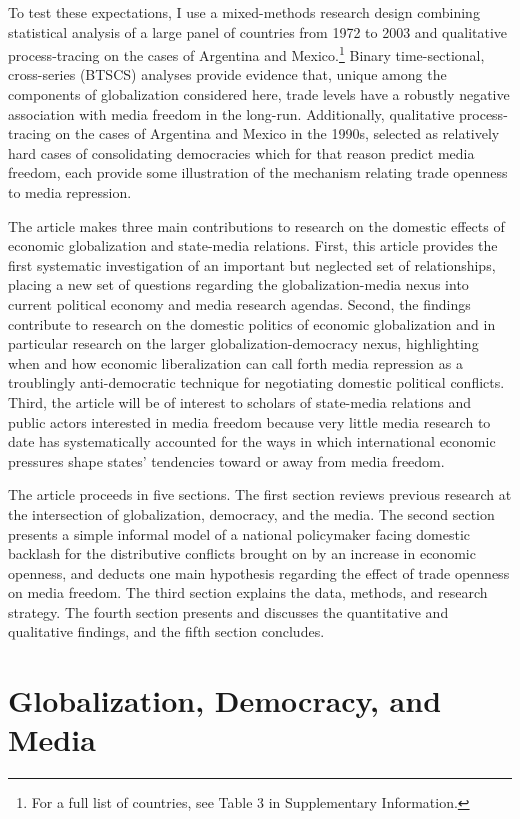 \documentclass[12pt,a4paper]{article}\usepackage[]{graphicx}\usepackage[]{color}
\begin{document}
To test these expectations, I use a mixed-methods research design combining statistical analysis of a large panel of countries from 1972 to 2003 and qualitative process-tracing on the cases of Argentina and Mexico.\footnote{For a full list of countries, see Table 3 in Supplementary Information.} Binary time-sectional, cross-series (BTSCS) analyses provide evidence that, unique among the components of globalization considered here, trade levels have a robustly negative association with media freedom in the long-run. Additionally, qualitative process-tracing on the cases of Argentina and Mexico in the 1990s, selected as relatively hard cases of consolidating democracies which for that reason predict media freedom, each provide some illustration of the mechanism relating trade openness to media repression.

The article makes three main contributions to research on the domestic effects of economic globalization and state-media relations. First, this article provides the first systematic investigation of an important but neglected set of relationships, placing a new set of questions regarding the globalization-media nexus into current political economy and media research agendas. Second, the findings contribute to research on the domestic politics of economic globalization and in particular research on the larger globalization-democracy nexus, highlighting when and how economic liberalization can call forth media repression as a troublingly anti-democratic technique for negotiating domestic political conflicts. Third, the article will be of interest to scholars of state-media relations and public actors interested in media freedom because very little media research to date has systematically accounted for the ways in which international economic pressures shape states' tendencies toward or away from media freedom.

The article proceeds in five sections. The first section reviews previous research at the intersection of globalization, democracy, and the media. The second section presents a simple informal model of a national policymaker facing domestic backlash for the distributive conflicts brought on by an increase in economic openness, and deducts one main hypothesis regarding the effect of trade openness on media freedom. The third section explains the data, methods, and research strategy. The fourth section presents and discusses the quantitative and qualitative findings, and the fifth section concludes.

\section{Globalization, Democracy, and Media}
\end{document}
